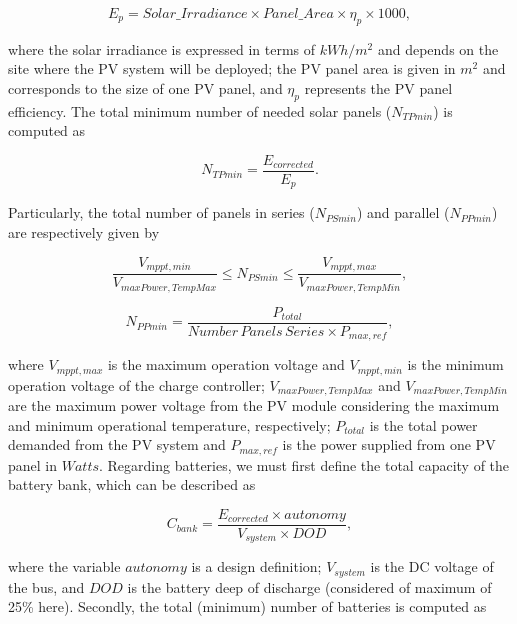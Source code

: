 \documentclass[review]{elsarticle}
\begin{document}
\begin{equation}
\label{eq:Ep}
E_{p} = Solar\_Irradiance \times Panel\_Area \times \eta_{p} \times 1000,
\end{equation}

\noindent where the solar irradiance is expressed in terms of $kWh/m^{2}$ and depends on the site where the PV system will be deployed; 
the PV panel area is given in $m^{2}$ and corresponds to the size of one PV panel, and $\eta_{p}$ represents the PV panel efficiency.
%
The total minimum number of needed solar panels ($N_{TPmin}$) is computed as

\begin{equation}
\label{eq:NTPmin}
N_{TPmin} = \dfrac{E_{corrected}}{E_{p}}.
\end{equation}

Particularly, the total number of panels in series ($N_{PSmin}$) and parallel ($N_{PPmin}$) are respectively given by

\begin{equation}
\label{eq:NPSmin}
\dfrac{V_{mppt,min}}{V_{maxPower,TempMax}} \leq N_{PSmin} \leq \dfrac{V_{mppt,max}}{V_{maxPower,TempMin}},
\end{equation}

\begin{equation}
\label{eq:NPPmin}
N_{PPmin} = \dfrac{P_{total}}{Number\,Panels\,Series \times P_{max,ref}},
\end{equation}

\noindent where $V_{mppt,max}$ is the maximum operation voltage and $V_{mppt,min}$ is the minimum operation voltage of the charge controller; $V_{maxPower,TempMax}$ and $V_{maxPower,TempMin}$ are the maximum power voltage from the PV module considering the maximum and minimum operational temperature, respectively; $P_{total}$ is the total power demanded from the PV system and $P_{max,ref}$ is the power supplied from one PV panel in $Watts$.
%
Regarding batteries, we must first define the total capacity of the battery bank, which can be described as

\begin{equation}
\label{eq:Cbank}
C_{bank} = \dfrac{E_{corrected} \times autonomy}{V_{system} \times DOD},
\end{equation}

\noindent where the variable $autonomy$ is a design definition; %
$ V_{system} $ is the DC voltage of the bus, and $ DOD $ is the battery deep of discharge (considered of maximum of 25\% here).
%
Secondly, the total (minimum) number of batteries is computed as 
\end{document}
